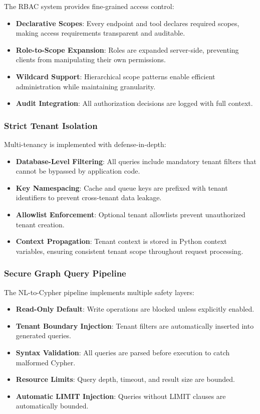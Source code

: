 The RBAC system provides fine-grained access control:

\begin{itemize}
    \item \textbf{Declarative Scopes}: Every endpoint and tool declares required scopes, making access requirements transparent and auditable.
    \item \textbf{Role-to-Scope Expansion}: Roles are expanded server-side, preventing clients from manipulating their own permissions.
    \item \textbf{Wildcard Support}: Hierarchical scope patterns enable efficient administration while maintaining granularity.
    \item \textbf{Audit Integration}: All authorization decisions are logged with full context.
\end{itemize}

\subsubsection{Strict Tenant Isolation}

Multi-tenancy is implemented with defense-in-depth:

\begin{itemize}
    \item \textbf{Database-Level Filtering}: All queries include mandatory tenant filters that cannot be bypassed by application code.
    \item \textbf{Key Namespacing}: Cache and queue keys are prefixed with tenant identifiers to prevent cross-tenant data leakage.
    \item \textbf{Allowlist Enforcement}: Optional tenant allowlists prevent unauthorized tenant creation.
    \item \textbf{Context Propagation}: Tenant context is stored in Python context variables, ensuring consistent tenant scope throughout request processing.
\end{itemize}

\subsubsection{Secure Graph Query Pipeline}

The NL-to-Cypher pipeline implements multiple safety layers:

\begin{itemize}
    \item \textbf{Read-Only Default}: Write operations are blocked unless explicitly enabled.
    \item \textbf{Tenant Boundary Injection}: Tenant filters are automatically inserted into generated queries.
    \item \textbf{Syntax Validation}: All queries are parsed before execution to catch malformed Cypher.
    \item \textbf{Resource Limits}: Query depth, timeout, and result size are bounded.
    \item \textbf{Automatic LIMIT Injection}: Queries without LIMIT clauses are automatically bounded.
\end{itemize}


